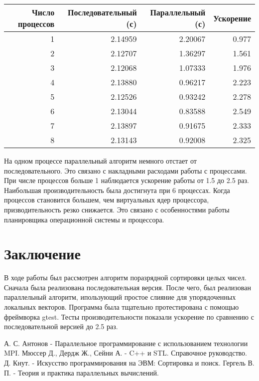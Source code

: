 \documentclass{report}
\begin{document}
    \begin{table}[!h]
    \centering
    \begin{tabular}{| r | r | r | r |}
    \hline
    Число процессов & Последовательный (с) & Параллельный (с) & Ускорение  \\[5pt]
    \hline
    1   & 2.14959    & 2.20067     & 0.977\\
    2   & 2.12707    & 1.36297     & 1.561 \\
    3   & 2.12068    & 1.07333     & 1.976 \\
    4   & 2.13880    & 0.96217     & 2.223 \\
    5   & 2.12526    & 0.93242     & 2.278 \\
    6   & 2.13044    & 0.83588     & 2.549 \\
    7   & 2.13897    & 0.91675     & 2.333 \\
    8   & 2.13143    & 0.92008     & 2.325 \\
    \hline
    \end{tabular}
    \end{table}
    
    \par На одном процессе параллельный алгоритм немного отстает от последовательного. Это связано с накладными расходами работы с процессами. При числе процессов больше 1 наблюдается ускорение работы от 1.5 до 2.5 раз. Наибольшая производительность была достигнута при 6 процессах. Когда процессов становится большем, чем виртуальных ядер процессора, призводительность резко снижается. Это связано с особенностями работы планировщика операционной системы и процессора.
    
    \newpage
	\section*{Заключение}
	
	\par В ходе работы был рассмотрен алгоритм поразрядной сортировки целых чисел. Сначала была реализована последовательная версия. После чего, был реализован параллельный алгоритм, ипользующий простое слияние для упорядоченных локальных векторов. Программа была тщательно протестирована с помощью фреймворка gtest. Тесты производительности показали ускорение по сравнению с последовательной версией до 2.5 раз.
	
	\newpage
	\begin{thebibliography}{1}
		 А. С. Антонов - Параллельное программирование с использованием технологии MPI.
		 Мюссер Д., Дердж Ж., Сейни А. - C++ и STL. Справочное руководство.
		 Д. Кнут. - Искусство программирования на ЭВМ: Сортировка и поиск.
		 Гергель В. П. - Теория и практика параллельных вычислений.
	\end{thebibliography}
	
\end{document}
